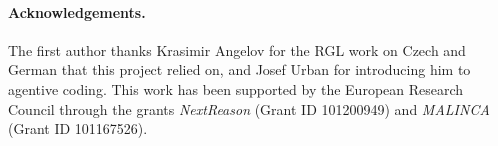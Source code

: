 \documentclass{easychair}
\begin{document}
\paragraph{Acknowledgements.} The first author thanks Krasimir Angelov for the RGL work on Czech
and German that this project relied on, and Josef Urban for introducing him to agentive coding.
This work has been supported by the European Research Council through the grants
\textit{NextReason} (Grant ID 101200949) and \textit{MALINCA} (Grant ID 101167526).



\end{document}
